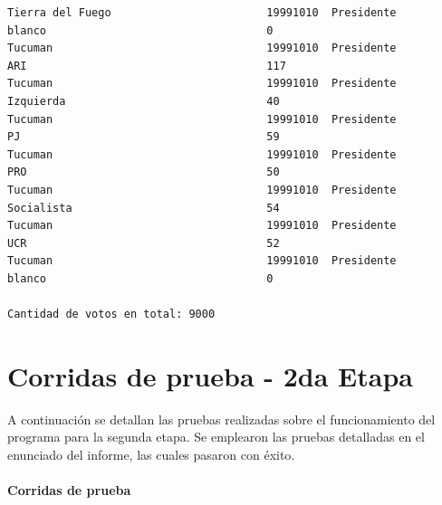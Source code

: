 \documentclass[a4paper,10pt]{article}
\begin{document}
\begin{verbatim}
Tierra del Fuego                        19991010  Presidente                    blanco                                  0              
Tucuman                                 19991010  Presidente                    ARI                                     117            
Tucuman                                 19991010  Presidente                    Izquierda                               40             
Tucuman                                 19991010  Presidente                    PJ                                      59             
Tucuman                                 19991010  Presidente                    PRO                                     50             
Tucuman                                 19991010  Presidente                    Socialista                              54             
Tucuman                                 19991010  Presidente                    UCR                                     52             
Tucuman                                 19991010  Presidente                    blanco                                  0              

Cantidad de votos en total: 9000

\end{verbatim}

\newpage



\section{Corridas de prueba - 2da Etapa}

A continuación se detallan las pruebas realizadas sobre el funcionamiento del programa para la segunda etapa. Se emplearon las pruebas detalladas en el enunciado del informe, las cuales pasaron con éxito.

\paragraph{Corridas de prueba}
\end{document}
